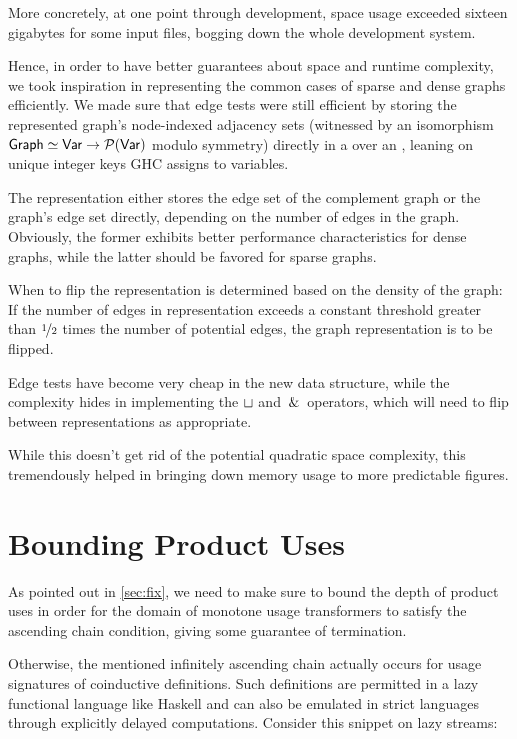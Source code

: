 More concretely, at one point through development, space usage exceeded sixteen gigabytes for some input files, bogging down the whole development system.

Hence, in order to have better guarantees about space and runtime complexity, we took inspiration in representing the common cases of sparse and dense graphs efficiently.
We made sure that edge tests were still efficient by storing the represented graph's node-indexed adjacency sets (witnessed by an isomorphism $\text{\textsf{Graph}} \simeq \text{\textsf{Var}} \to \mathcal{P}(\text{\textsf{Var}})$ modulo symmetry) directly in a  over an , leaning on unique integer keys GHC assigns to variables.

The representation either stores the edge set of the complement graph or the graph's edge set directly, depending on the number of edges in the graph.
Obviously, the former exhibits better performance characteristics for dense graphs, while the latter should be favored for sparse graphs.

When to flip the representation is determined based on the density of the graph:
If the number of edges in representation exceeds a constant threshold greater than $\nicefrac{1}{2}$ times the number of potential edges, the graph representation is to be flipped.

Edge tests have become very cheap in the new data structure, while the complexity hides in implementing the $\sqcup$ and $\,\&\,$ operators, which will need to flip between representations as appropriate.

While this doesn't get rid of the potential quadratic space complexity, this tremendously helped in bringing down memory usage to more predictable figures.

\section{Bounding Product Uses}\label{sec:bound}

As pointed out in \cref{sec:fix}, we need to make sure to bound the depth of product uses in order for the domain of monotone usage transformers to satisfy the ascending chain condition, giving some guarantee of termination.

Otherwise, the mentioned infinitely ascending chain actually occurs for usage signatures of coinductive definitions. 
Such definitions are permitted in a lazy functional language like Haskell and can also be emulated in strict languages through explicitly delayed computations. 
Consider this snippet on lazy streams:

